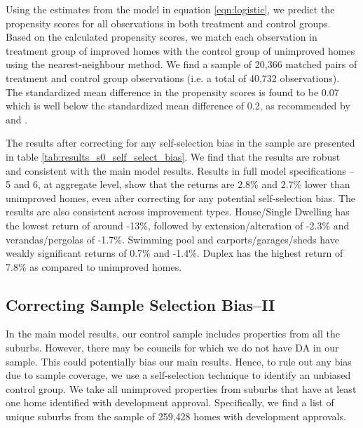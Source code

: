 \documentclass[AEJ,reqno, draftmode]{AEA} %
\begin{document}
Using the estimates from the model in equation \ref{eqn:logistic}, we predict the propensity scores for all observations in both treatment and control groups. Based on the calculated propensity scores, we match each observation in treatment group of improved homes with the control group of unimproved homes using the nearest-neighbour method. We find a sample of 20,366 matched pairs of treatment and control group observations (i.e. a total of 40,732 observations). The standardized mean difference in the propensity scores is found to be 0.07 which is well below the standardized mean difference of 0.2, as recommended by \citet{austin2011optimal} and \citet{wang2013optimal}.

The results after correcting for any self-selection bias in the sample are presented in table \ref{tab:results_s0_self_select_bias}. We find that the results are robust and consistent with the main model results. Results in full model specifications -- 5 and 6, at aggregate level, show that the returns are 2.8\% and 2.7\% lower than unimproved homes, even after correcting for any potential self-selection bias. The results are also consistent across improvement types. House/Single Dwelling has the lowest return of around -13\%, followed by extension/alteration of -2.3\% and verandas/pergolas of -1.7\%. Swimming pool and carports/garages/sheds have weakly significant returns of 0.7\% and -1.4\%. Duplex has the highest return of 7.8\% as compared to unimproved homes.




\restoregeometry




\subsection{Correcting Sample Selection Bias--II}

In the main model results, our control sample includes properties from all the suburbs. However, there may be councils for which we do not have DA in our sample. This could potentially bias our main results. Hence, to rule out any bias due to sample coverage, we use a self-selection technique to identify an unbiased control group. We take all unimproved properties from suburbs that have at least one home identified with development approval. Specifically, we find a list of unique suburbs from the sample of 259,428 homes with development approvals.
\end{document}
